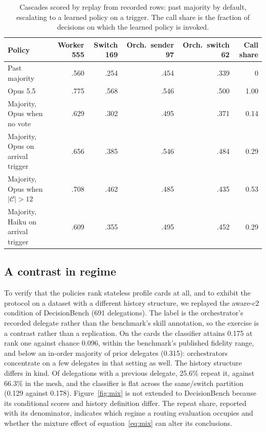 \documentclass[11pt]{article}
\theoremstyle{definition}
\newcommand{\C}{\mathcal{C}}
\begin{document}
\begin{table}[t]
\centering\footnotesize
\caption{Cascades scored by replay from recorded rows: past majority by default, escalating to a learned policy on a trigger. The call share is the fraction of decisions on which the learned policy is invoked.}
\label{tab:cascade}
\begin{tabular}{lrrrrr}
\toprule
Policy & Worker 555 & Switch 169 & Orch.\ sender 97 & Orch.\ switch 62 & Call share \\
\midrule
Past majority & .560 & .254 & .454 & .339 & 0 \\
Opus 5.5 & .775 & .568 & .546 & .500 & 1.00 \\
Majority, Opus when no vote & .629 & .302 & .495 & .371 & 0.14 \\
Majority, Opus on arrival trigger & .656 & .385 & .546 & .484 & 0.29 \\
Majority, Opus when $|\C| > 12$ & .708 & .462 & .485 & .435 & 0.53 \\
Majority, Haiku on arrival trigger & .609 & .355 & .495 & .452 & 0.29 \\
\bottomrule
\end{tabular}
\end{table}

\subsection{A contrast in regime}
\label{sec:decisionbench}

To verify that the policies rank stateless profile cards at all, and to exhibit the protocol on a dataset with a different history structure, we replayed the aware-c2 condition of DecisionBench \citep{decisionbench2026} (691 delegations). The label is the orchestrator's recorded delegate rather than the benchmark's skill annotation, so the exercise is a contrast rather than a replication. On the cards the classifier attains 0.175 at rank one against chance 0.096, within the benchmark's published fidelity range, and below an in-order majority of prior delegates (0.315): orchestrators concentrate on a few delegates in that setting as well. The history structure differs in kind. Of delegations with a previous delegate, 25.6\% repeat it, against 66.3\% in the mesh, and the classifier is flat across the same/switch partition (0.129 against 0.178). Figure~\ref{fig:mix} is not extended to DecisionBench because its conditional scores and history definition differ. The repeat share, reported with its denominator, indicates which regime a routing evaluation occupies and whether the mixture effect of equation~\ref{eq:mix} can alter its conclusions.
\end{document}
